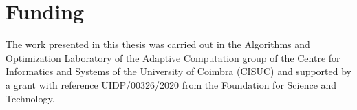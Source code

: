 \thispagestyle{empty}

\chapter*{Funding}

The work presented in this thesis was carried out in the Algorithms and
Optimization Laboratory of the Adaptive Computation group of the Centre for
Informatics and Systems of the University of Coimbra (CISUC) and supported by a
grant with reference UIDP/00326/2020 from the Foundation for Science and
Technology.

\cleardoublepage